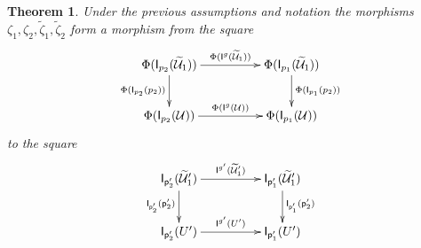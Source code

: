 \documentclass[12pt]{article}
\numberwithin{equation}{section}
\newtheorem{theorem}[proposition]{Theorem}
\newcommand{\llabel}[1]{\label{#1}}
\newcommand{\wt}{\widetilde}
\newcommand{\p}{\mathsf{p}}
\newcommand{\U}{\mathcal{U}}
\newcommand{\I}{\mathsf{I}}
\begin{document}
%
\begin{theorem}
\llabel{2015.04.10.th3} Under the previous assumptions and notation the
morphisms $\zeta_1,\zeta_2,\wt{\zeta}_1,\wt{\zeta}_2$ form a morphism from the
square
%
$$
\begin{xy}
          \xymatrix@C=4pc{ \Phi(\I_{p_2}(\wt{\U}_1))
            \ar[r]^-{\Phi(\I^g(\wt{\U}_1))} \ar[d]_{\Phi(\I_{p_2}(p_2))} &
            \Phi(\I_{p_1}(\wt{\U}_1))
            \ar[d]^{\Phi(\I_{p_1}(p_2))}\\ \Phi(\I_{p_2}(\U))
            \ar[r]^{\Phi(\I^g(\U))} & \Phi(\I_{p_1}(\U)) }
\end{xy}
$$
%
to the square
%
$$
\begin{xy}
          \xymatrix@C=4pc{
                 \I_{\p_2'}(\wt{\U}_1')   \ar[r]^-{\I^{g'}(\wt{\U}_1')} \ar[d]_{\I_{\p_2'}(\p_2')} & 
                 \I_{\p_1'}(\wt{\U}_1') \ar[d]^{\I_{\p_1'}(\p_2')}\\
		\I_{\p_2'}(U')   \ar[r]^{\I^{g'}(U')} &
		\I_{\p_1'}(U')
                }
\end{xy}
$$
%
\end{theorem}
%
\end{document}
